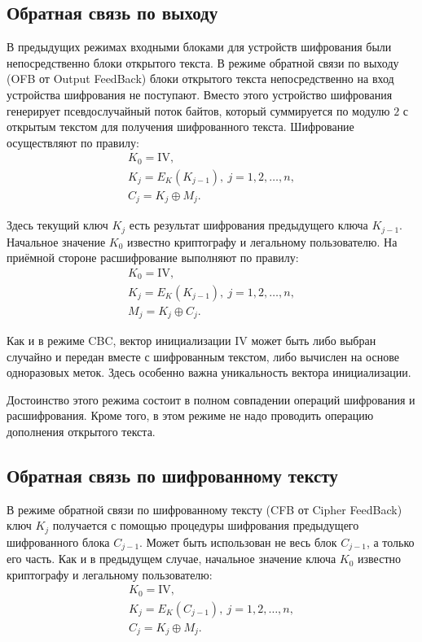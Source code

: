 \subsection{Обратная связь по выходу}

В предыдущих режимах входными блоками для устройств шифрования были непосредственно блоки открытого текста.
В режиме обратной связи по выходу (OFB от Output FeedBack) блоки открытого текста непосредственно на вход устройства шифрования не поступают. Вместо этого устройство шифрования генерирует псевдослучайный поток байтов, который суммируется по модулю $2$ с открытым текстом для получения шифрованного текста. Шифрование осуществляют по правилу:
\[ \begin{array}{l}
    K_0 = \textrm{IV}, \\
    K_j = E_K(K_{j-1}), ~ j = 1, 2, \dots, n, \\
    C_j = K_j \oplus M_j.
\end{array} \]

Здесь текущий ключ $K_j$ есть результат шифрования предыдущего ключа $K_{j-1}$. Начальное значение $K_0$ известно криптографу и легальному пользователю. На приёмной стороне расшифрование выполняют по правилу:
\[ \begin{array}{l}
    K_0 = \textrm{IV}, \\
    K_j = E_K(K_{j-1}), ~ j = 1, 2, \dots, n, \\
    M_j = K_j \oplus C_j.
\end{array} \]

Как и в режиме CBC, вектор инициализации $\textrm{IV}$ может быть либо выбран случайно и передан вместе с шифрованным текстом, либо вычислен на основе одноразовых меток. Здесь особенно важна уникальность вектора инициализации.

Достоинство этого режима состоит в полном совпадении операций шифрования и расшифрования. Кроме того, в этом режиме не надо проводить операцию дополнения открытого текста.


\subsection{Обратная связь по шифрованному тексту}

В режиме обратной связи по шифрованному тексту (CFB от Cipher FeedBack) ключ $K_j$ получается с помощью процедуры шифрования предыдущего шифрованного блока $C_{j-1}$. Может быть использован не весь блок $C_{j-1}$, а только его часть. Как и в предыдущем случае, начальное значение ключа $K_0$ известно криптографу и легальному пользователю:
\[ \begin{array}{l}
    K_0 = \textrm{IV}, \\
    K_j = E_K(C_{j-1}), ~ j = 1, 2, \dots, n,\\
    C_j = K_j \oplus M_j.
\end{array} \]


